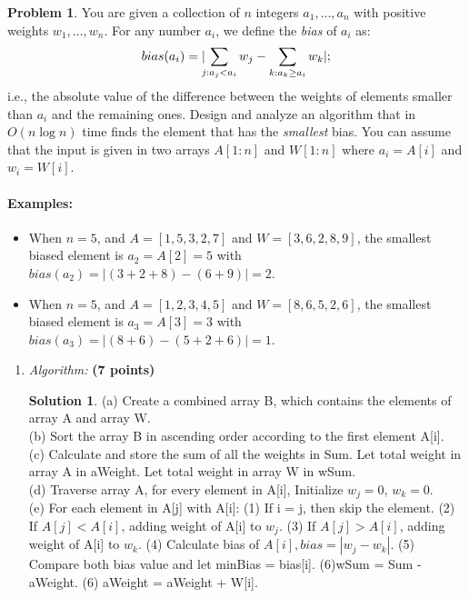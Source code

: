 \documentclass{article}
\theoremstyle{definition}
\newtheorem{problem}{Problem}
\newtheorem*{solution*}{Solution}
\newenvironment{solution}{\begin{solution*}}{{} \end{solution*}}
\newcommand{\grade}[1]{\hfill{\textbf{($\mathbf{#1}$ points)}}}
\begin{document}
\newpage

\begin{problem}\label{sort}
	You are given a collection of $n$ integers $a_1,\ldots,a_n$ with positive weights $w_1,\ldots,w_n$. For any number $a_i$, we define the \emph{bias} of $a_i$ as:
	\[
		bias(a_i) = |\hspace{-0.1cm}{\sum_{j: a_j < a_i} w_j} - \sum_{k: a_k \geq a_i} w_k|;
	\]
	i.e., the absolute value of the difference between the weights of elements smaller than $a_i$ and the remaining ones. 
	Design and analyze an algorithm that in $O(n\log{n})$ time 
	finds the element that has the \emph{smallest} bias. You can assume that the input is given in two arrays $A[1:n]$ and $W[1:n]$ where $a_i = A[i]$ and $w_i = W[i]$.  

	
	\paragraph{Examples:} 
	\begin{itemize}
	\item When $n=5$, and $A = [1,5,3,2,7]$ and $W=[3,6,2,8,9]$, the smallest biased element is $a_2 = A[2] = 5$ with $bias(a_2) = |(3+2+8)-(6+9)| = 2$.   
	\item When $n=5$, and $A = [1,2,3,4,5]$ and $W=[8,6,5,2,6]$, the smallest biased element is $a_3 = A[3] = 3$ with $bias(a_3) = |(8+6)-(5+2+6)| = 1$. 
	\end{itemize}
	
	\begin{enumerate}[label=(\alph*)]
		\item \emph{Algorithm:} \grade{7}
	
	\bigskip	
	\begin{solution}
	
	(a) Create a combined array B, which contains the elements of array A and array W. \\

	(b) Sort the array B in ascending order according to the first element A[i]. \\
	
	(c) Calculate and store the sum of all the weights in Sum. Let total weight in array A in aWeight. Let total weight in array W in wSum. \\
	
	(d) Traverse array A, for every element in A[i], Initialize $w_j = 0$, $w_k = 0$. \\
	
	(e) For each element in A[j] with A[i]: 	(1) If i = j, then skip the element. 	(2) If $A[j] < A[i]$, adding weight of A[i] to $w_j$. 	(3) If $A[j] > A[i]$, adding weight of A[i] to $w_k$. 	(4) Calculate bias of $A[i], bias = |w_j - w_k|$. 	(5) 	Compare both bias value and let minBias = bias[i].	(6)wSum = Sum - aWeight. 	(6) aWeight = aWeight + W[i]. \\
	

\end{solution}
\end{enumerate}
\end{problem}
\end{document}
